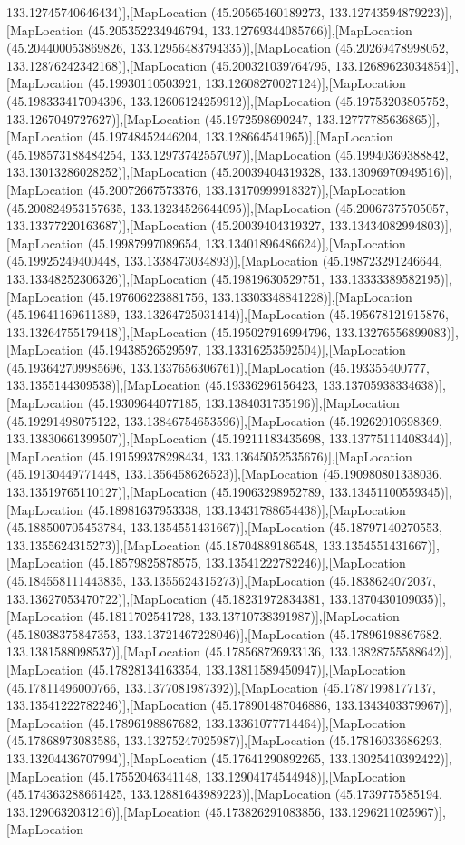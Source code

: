 133.12745740646434)],[MapLocation (45.20565460189273, 133.12743594879223)],[MapLocation (45.205352234946794, 133.12769344085766)],[MapLocation (45.204400053869826, 133.12956483794335)],[MapLocation (45.20269478998052, 133.12876242342168)],[MapLocation (45.200321039764795, 133.12689623034854)],[MapLocation (45.19930110503921, 133.12608270027124)],[MapLocation (45.198333417094396, 133.12606124259912)],[MapLocation (45.19753203805752, 133.1267049727627)],[MapLocation (45.1972598690247, 133.12777785636865)],[MapLocation (45.19748452446204, 133.128664541965)],[MapLocation (45.198573188484254, 133.12973742557097)],[MapLocation (45.19940369388842, 133.13013286028252)],[MapLocation (45.20039404319328, 133.13096970949516)],[MapLocation (45.20072667573376, 133.13170999918327)],[MapLocation (45.200824953157635, 133.13234526644095)],[MapLocation (45.20067375705057, 133.13377220163687)],[MapLocation (45.20039404319327, 133.13434082994803)],[MapLocation (45.19987997089654, 133.13401896486624)],[MapLocation (45.19925249400448, 133.1338473034893)],[MapLocation (45.198723291246644, 133.13348252306326)],[MapLocation (45.19819630529751, 133.13333389582195)],[MapLocation (45.197606223881756, 133.13303348841228)],[MapLocation (45.19641169611389, 133.13264725031414)],[MapLocation (45.195678121915876, 133.13264755179418)],[MapLocation (45.195027916994796, 133.13276556899083)],[MapLocation (45.19438526529597, 133.13316253592504)],[MapLocation (45.193642709985696, 133.1337656306761)],[MapLocation (45.193355400777, 133.1355144309538)],[MapLocation (45.19336296156423, 133.13705938334638)],[MapLocation (45.19309644077185, 133.1384031735196)],[MapLocation (45.19291498075122, 133.13846754653596)],[MapLocation (45.19262010698369, 133.13830661399507)],[MapLocation (45.19211183435698, 133.13775111408344)],[MapLocation (45.191599378298434, 133.13645052535676)],[MapLocation (45.19130449771448, 133.1356458626523)],[MapLocation (45.190980801338036, 133.13519765110127)],[MapLocation (45.19063298952789, 133.13451100559345)],[MapLocation (45.18981637953338, 133.13431788654438)],[MapLocation (45.188500705453784, 133.1354551431667)],[MapLocation (45.18797140270553, 133.1355624315273)],[MapLocation (45.18704889186548, 133.1354551431667)],[MapLocation (45.18579825878575, 133.13541222782246)],[MapLocation (45.184558111443835, 133.1355624315273)],[MapLocation (45.1838624072037, 133.13627053470722)],[MapLocation (45.18231972834381, 133.1370430109035)],[MapLocation (45.1811702541728, 133.13710738391987)],[MapLocation (45.18038375847353, 133.13721467228046)],[MapLocation (45.17896198867682, 133.1381588098537)],[MapLocation (45.178568726933136, 133.13828755588642)],[MapLocation (45.17828134163354, 133.13811589450947)],[MapLocation (45.17811496000766, 133.1377081987392)],[MapLocation (45.17871998177137, 133.13541222782246)],[MapLocation (45.178901487046886, 133.1343403379967)],[MapLocation (45.17896198867682, 133.13361077714464)],[MapLocation (45.17868973083586, 133.13275247025987)],[MapLocation (45.17816033686293, 133.13204436707994)],[MapLocation (45.17641290892265, 133.13025410392422)],[MapLocation (45.17552046341148, 133.12904174544948)],[MapLocation (45.174363288661425, 133.12881643989223)],[MapLocation (45.1739775585194, 133.1290632031216)],[MapLocation (45.173826291083856, 133.1296211025967)],[MapLocation 